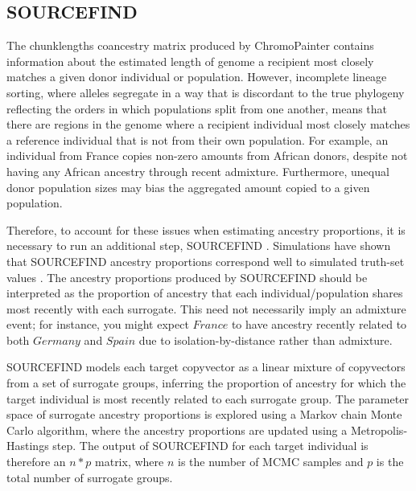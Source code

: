 \subsection{SOURCEFIND}

The chunklengths coancestry matrix produced by ChromoPainter contains information about the estimated length of genome a recipient most closely matches a given donor individual or population. However, incomplete lineage sorting, where alleles segregate in a way that is discordant to the true phylogeny reflecting the orders in which populations split from one another, means that there are regions in the genome where a recipient individual most closely matches a reference individual that is not from their own population. For example, an individual from France copies non-zero amounts from African donors, despite not having any African ancestry through recent admixture. Furthermore, unequal donor population sizes may bias the aggregated amount copied to a given population. 

Therefore, to account for these issues when estimating ancestry proportions, it is necessary to run an additional step, SOURCEFIND \cite{Chacon-Duque2018}. Simulations have shown that SOURCEFIND ancestry proportions correspond well to simulated truth-set values \cite{Chacon-Duque2018}. The ancestry proportions produced by SOURCEFIND should be interpreted as the proportion of ancestry that each individual/population shares most recently with each surrogate. This need not necessarily imply an admixture event; for instance, you might expect $France$ to have ancestry recently related to both $Germany$ and $Spain$ due to isolation-by-distance rather than admixture. 

SOURCEFIND models each target copyvector as a linear mixture of copyvectors from a set of surrogate groups, inferring the proportion of ancestry for which the target individual is most recently related to each surrogate group. The parameter space of surrogate ancestry proportions is explored using a Markov chain Monte Carlo algorithm, where the ancestry proportions are updated using a Metropolis-Hastings step. The output of SOURCEFIND for each target individual is therefore an $n*p$ matrix, where $n$ is the number of MCMC samples and $p$ is the total number of surrogate groups. 

